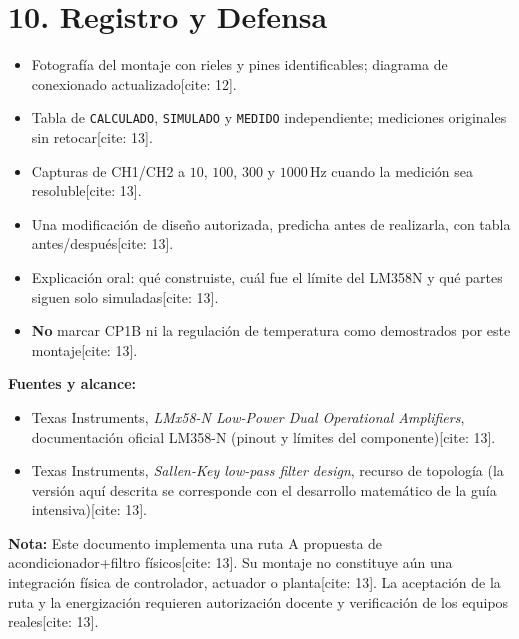 \documentclass[11pt, a4paper]{article}
\begin{document}
\section{10. Registro y Defensa}
\begin{itemize}[noitemsep, leftmargin=*]
    \item Fotografía del montaje con rieles y pines identificables; diagrama de conexionado actualizado[cite: 12].
    \item Tabla de \texttt{CALCULADO}, \texttt{SIMULADO} y \texttt{MEDIDO} independiente; mediciones originales sin retocar[cite: 13].
    \item Capturas de CH1/CH2 a $10$, $100$, $300$ y $1000\,\text{Hz}$ cuando la medición sea resoluble[cite: 13].
    \item Una modificación de diseño autorizada, predicha antes de realizarla, con tabla antes/después[cite: 13].
    \item Explicación oral: qué construiste, cuál fue el límite del LM358N y qué partes siguen solo simuladas[cite: 13].
    \item \textbf{No} marcar CP1B ni la regulación de temperatura como demostrados por este montaje[cite: 13].
\end{itemize}

\textbf{Fuentes y alcance:}
\begin{itemize}[noitemsep, leftmargin=*]
    \item Texas Instruments, \textit{LMx58-N Low-Power Dual Operational Amplifiers}, documentación oficial LM358-N (pinout y límites del componente)[cite: 13].
    \item Texas Instruments, \textit{Sallen-Key low-pass filter design}, recurso de topología (la versión aquí descrita se corresponde con el desarrollo matemático de la guía intensiva)[cite: 13].
\end{itemize}
\textbf{Nota:} Este documento implementa una ruta A propuesta de acondicionador+filtro físicos[cite: 13]. Su montaje no constituye aún una integración física de controlador, actuador o planta[cite: 13]. La aceptación de la ruta y la energización requieren autorización docente y verificación de los equipos reales[cite: 13].
\end{document}
